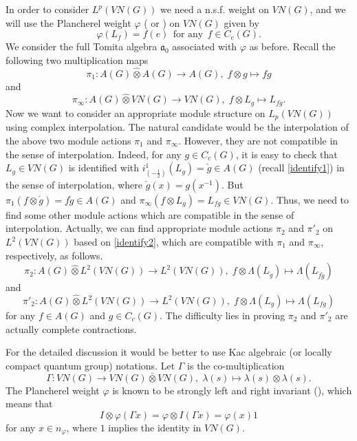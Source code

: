 \documentclass[10pt]{amsart}
\numberwithin{thm}{section}
\numberwithin{equation}{section}
\begin{document}
In order to consider $L^p(VN(G))$ we need a n.s.f. weight on $VN(G)$,
and we will use the Plancherel weight $\varphi$ (\cite[III.3.3]{Bla} or \cite[VII.3]{Ta03}) on $VN(G)$ given by
	$$\varphi(L_f) = f(e)\;\, \text{for any}\;\, f\in C_c(G).$$
We consider the full Tomita algebra $\mathfrak{a}_0$ associated with $\varphi$ as before. 
Recall the following two multiplication maps
	$$\pi_1 : A(G) {\widehat{\otimes}} A(G) \rightarrow A(G),\; f\otimes g \mapsto f g$$
and
	$$\pi_\infty : A(G) {\widehat{\otimes}} VN(G) \rightarrow VN(G),\; f\otimes L_g \mapsto L_{f g}.$$
Now we want to consider an appropriate module structure on $L_p(VN(G))$ using complex interpolation.
The natural candidate would be the interpolation of the above two module actions $\pi_1$ and $\pi_\infty$.
However, they are not compatible in the sense of interpolation.
Indeed, for any $g\in C_c(G)$, it is easy to check that $L_g \in VN(G)$ is identified with
$i^1_{(-\frac{1}{2})}(L_g) = \check{g} \in A(G)$ (recall \eqref{identify1}) in the sense of interpolation, where $\check{g}(x) = g(x^{-1})$.
But $\pi_1(f \otimes \check{g}) = f \check{g} \in A(G)$ and $\pi_\infty (f\otimes L_g) = L_{f g} \in VN(G)$.
Thus, we need to find some other module actions which are compatible in the sense of interpolation.
Actually, we can find appropriate module actions $\pi_2$ and $\pi'_2$ on $L^2(VN(G))$ based on \eqref{identify2},
which are compatible with $\pi_1$ and $\pi_\infty$, respectively, as follows.
	$$\pi_2 : A(G) {\widehat{\otimes}} L^2(VN(G)) \rightarrow L^2(VN(G)),\; f \otimes \Lambda(L_{\check{g}}) \mapsto \Lambda(L_{\check{f} \check{g}})$$
and
	$$\pi'_2 : A(G) {\widehat{\otimes}} L^2(VN(G)) \rightarrow L^2(VN(G)),\; f \otimes \Lambda(L_g) \mapsto \Lambda(L_{f g})$$
for any $f\in A(G)$ and $g\in C_c(G)$.
The difficulty lies in proving $\pi_2$ and $\pi'_2$ are actually complete contractions.

For the detailed discussion it would be better to use Kac algebraic (or locally compact quantum group) notations.
Let $\Gamma$ is the co-multiplication
	$$\Gamma : VN(G) \rightarrow VN(G) \bar{\otimes} VN(G),\; \lambda(s) \mapsto \lambda(s)\otimes \lambda(s).$$
The Plancherel weight $\varphi$ is known to be strongly left and right invariant (\cite{ES92}), which means that
	\begin{equation}\label{left-inv}
	I \otimes \varphi (\Gamma x) = \varphi \otimes I (\Gamma x) = \varphi(x)  1
	\end{equation}
for any $x\in n_\varphi$, where $1$ implies the identity in $VN(G)$.
\end{document}
